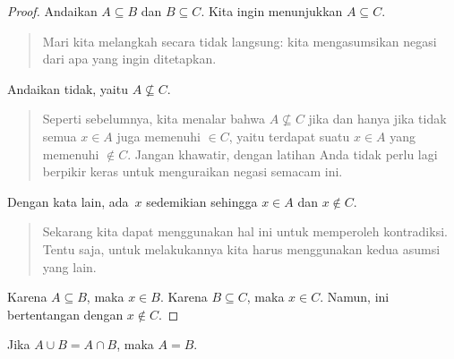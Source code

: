 \documentclass[../../../include/open-logic-section]{subfiles}
\begin{document}
\begin{proof}
  Andaikan $A \subseteq B$ dan $B \subseteq C$. Kita ingin menunjukkan
  $A \subseteq C$.
  \begin{quote}
    Mari kita melangkah secara tidak langsung: kita mengasumsikan
    negasi dari apa yang ingin ditetapkan.
  \end{quote}
  Andaikan tidak, yaitu $A \nsubseteq C$.
  \begin{quote}
    Seperti sebelumnya, kita menalar bahwa $A \nsubseteq C$ jika dan
    hanya jika tidak semua $x \in A$ juga memenuhi $\in C$, yaitu
    terdapat suatu $x \in A$ yang memenuhi $\notin C$. Jangan
    khawatir, dengan latihan Anda tidak perlu lagi berpikir keras untuk
    menguraikan negasi semacam ini.
  \end{quote}
  Dengan kata lain, ada~$x$ sedemikian sehingga $x \in A$ dan $x
  \notin C$.
  \begin{quote}
    Sekarang kita dapat menggunakan hal ini untuk memperoleh
    kontradiksi. Tentu saja, untuk melakukannya kita harus menggunakan
    kedua asumsi yang lain.
  \end{quote}
  Karena $A \subseteq B$, maka $x \in B$. Karena $B \subseteq C$, maka
  $x \in C$. Namun, ini bertentangan dengan $x \notin C$.
\end{proof}

\begin{prop}
Jika $A \cup B = A \cap B$, maka $A = B$.
\end{prop}
\end{document}
